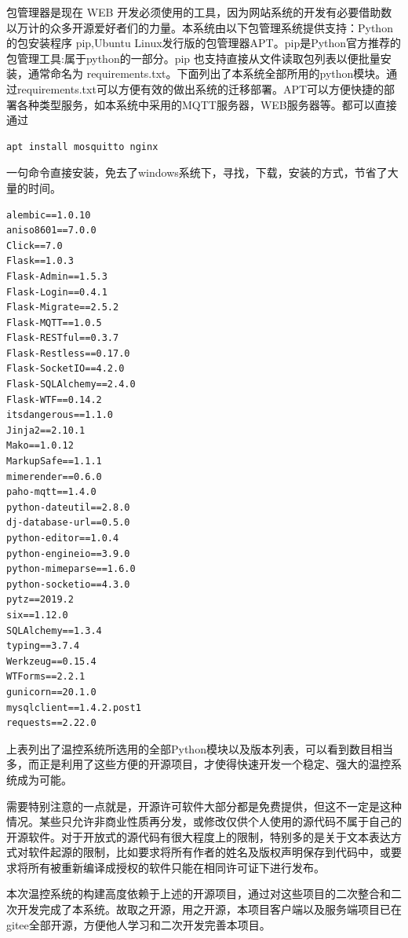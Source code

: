 包管理器是现在 WEB 开发必须使用的工具，因为网站系统的开发有必要借助数以万计的众多开源爱好者们的力量。本系统由以下包管理系统提供支持：Python的包安装程序 pip,Ubuntu Linux发行版的包管理器APT。pip是Python官方推荐的包管理工具:属于python的一部分。pip 也支持直接从文件读取包列表以便批量安装，通常命名为 requirements.txt。下面列出了本系统全部所用的python模块。通过requirements.txt可以方便有效的做出系统的迁移部署。APT可以方便快捷的部署各种类型服务，如本系统中采用的MQTT服务器，WEB服务器等。都可以直接通过\begin{lstlisting}[language=bash]
apt install mosquitto nginx
\end{lstlisting}一句命令直接安装，免去了windows系统下，寻找，下载，安装的方式，节省了大量的时间。

\begin{lstlisting}[title=温控系统所选用的全部Python模块以及版本列表]
alembic==1.0.10
aniso8601==7.0.0
Click==7.0
Flask==1.0.3
Flask-Admin==1.5.3
Flask-Login==0.4.1
Flask-Migrate==2.5.2
Flask-MQTT==1.0.5
Flask-RESTful==0.3.7
Flask-Restless==0.17.0
Flask-SocketIO==4.2.0
Flask-SQLAlchemy==2.4.0
Flask-WTF==0.14.2
itsdangerous==1.1.0
Jinja2==2.10.1
Mako==1.0.12
MarkupSafe==1.1.1
mimerender==0.6.0
paho-mqtt==1.4.0
python-dateutil==2.8.0
dj-database-url==0.5.0
python-editor==1.0.4
python-engineio==3.9.0
python-mimeparse==1.6.0
python-socketio==4.3.0
pytz==2019.2
six==1.12.0
SQLAlchemy==1.3.4
typing==3.7.4
Werkzeug==0.15.4
WTForms==2.2.1
gunicorn==20.1.0 
mysqlclient==1.4.2.post1
requests==2.22.0
\end{lstlisting}

上表列出了温控系统所选用的全部Python模块以及版本列表，可以看到数目相当多，而正是利用了这些方便的开源项目，才使得快速开发一个稳定、强大的温控系统成为可能。

需要特别注意的一点就是，开源许可软件大部分都是免费提供，但这不一定是这种情况。某些只允许非商业性质再分发，或修改仅供个人使用的源代码不属于自己的开源软件。对于开放式的源代码有很大程度上的限制，特别多的是关于文本表达方式对软件起源的限制，比如要求将所有作者的姓名及版权声明保存到代码中，或要求将所有被重新编译成授权的软件只能在相同许可证下进行发布。

本次温控系统的构建高度依赖于上述的开源项目，通过对这些项目的二次整合和二次开发完成了本系统。故取之开源，用之开源，本项目客户端以及服务端项目已在gitee全部开源，方便他人学习和二次开发完善本项目。
